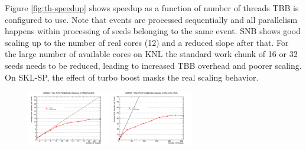 \documentclass{webofc}
\def\threep{0.32\textwidth}
\begin{document}
Figure \ref{fig:th-speedup} shows speedup as a function of number of threads
TBB is configured to use. Note that events are processed sequentially and all
parallelism happens within processing of seeds belonging to the same
event. SNB shows good scaling up to the number of real cores (12) and a
reduced slope after that. For the large number of available cores on KNL the
standard work chunk of 16 or 32 seeds needs to be reduced, leading to
increased TBB overhead and poorer scaling. On SKL-SP, the effect of turbo 
boost masks the real scaling behavior.

\begin{figure}[htb]
  \centering
  \includegraphics[width=\threep]{figs/comp/SNB_CMSSW_TTbar_PU70_TH_speedup.png}
  \hfill
  \includegraphics[width=\threep]{figs/comp/KNL_CMSSW_TTbar_PU70_TH_speedup.png}
  \hfill

\end{figure}
\end{document}
